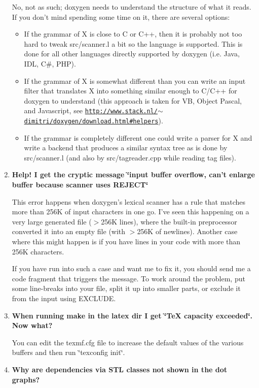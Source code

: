 \begin{enumerate}
No, not as such; doxygen needs to understand the structure of what it reads. If you don't mind spending some time on it, there are several options:\begin{itemize}
\item If the grammar of X is close to C or C++, then it is probably not too hard to tweak src/scanner.l a bit so the language is supported. This is done for all other languages directly supported by doxygen (i.e. Java, IDL, C\#, PHP).\item If the grammar of X is somewhat different than you can write an input filter that translates X into something similar enough to C/C++ for doxygen to understand (this approach is taken for VB, Object Pascal, and Javascript, see \href{http://www.stack.nl/~dimitri/doxygen/download.html#helpers}{\tt http://www.stack.nl/$\sim$dimitri/doxygen/download.html\#helpers}).\item If the grammar is completely different one could write a parser for X and write a backend that produces a similar syntax tree as is done by src/scanner.l (and also by src/tagreader.cpp while reading tag files).\end{itemize}


\item {\bf Help! I get the cryptic message \char`\"{}input buffer overflow, can't enlarge buffer because scanner uses REJECT\char`\"{}}

This error happens when doxygen's lexical scanner has a rule that matches more than 256K of input characters in one go. I've seen this happening on a very large generated file ($>$256K lines), where the built-in preprocessor converted it into an empty file (with $>$256K of newlines). Another case where this might happen is if you have lines in your code with more than 256K characters.

If you have run into such a case and want me to fix it, you should send me a code fragment that triggers the message. To work around the problem, put some line-breaks into your file, split it up into smaller parts, or exclude it from the input using EXCLUDE.

\item {\bf When running make in the latex dir I get \char`\"{}TeX capacity exceeded\char`\"{}. Now what?}

You can edit the texmf.cfg file to increase the default values of the various buffers and then run \char`\"{}texconfig init\char`\"{}.

\item {\bf Why are dependencies via STL classes not shown in the dot graphs?}


\end{enumerate}
